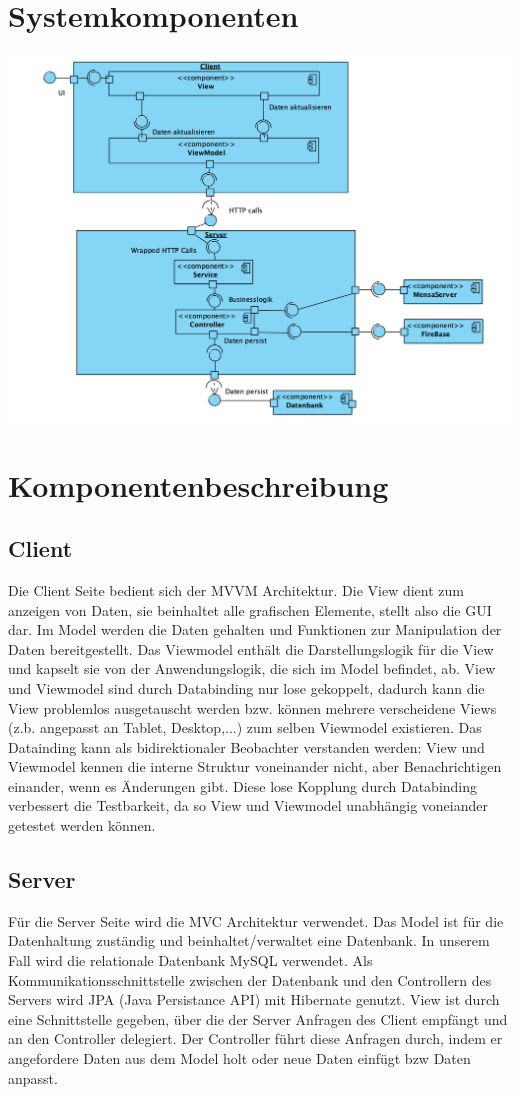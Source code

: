 \documentclass[a4paper]{scrreprt}
\begin{document}
\section{Systemkomponenten}
\includegraphics[width=1.1\textwidth]{Objektdiagramme/komponentDiagramm.png}
\section{Komponentenbeschreibung}
\subsection{Client}
Die Client Seite bedient sich der MVVM Architektur. Die View dient zum anzeigen von Daten, sie beinhaltet alle grafischen Elemente, stellt also die GUI dar. Im Model werden die Daten gehalten und Funktionen zur Manipulation der Daten bereitgestellt.
Das Viewmodel enthält die Darstellungslogik für die View und kapselt sie von der Anwendungslogik, die sich im Model befindet, ab.
View und Viewmodel sind durch Databinding nur lose gekoppelt, dadurch kann die View problemlos ausgetauscht werden bzw. können mehrere verscheidene Views (z.b. angepasst an Tablet, Desktop,...) zum selben Viewmodel existieren.
Das Datainding kann als bidirektionaler Beobachter verstanden werden: View und Viewmodel kennen die interne Struktur voneinander nicht, aber Benachrichtigen einander, wenn es Änderungen gibt. Diese lose Kopplung durch Databinding verbessert die Testbarkeit, da so View und Viewmodel unabhängig voneiander getestet werden können.

\subsection{Server}
Für die Server Seite wird die MVC Architektur verwendet.
Das Model ist für die Datenhaltung zuständig und beinhaltet/verwaltet eine Datenbank.  In unserem Fall wird die relationale Datenbank MySQL verwendet. Als Kommunikationsschnittstelle zwischen der Datenbank und den Controllern des Servers wird JPA (Java Persistance API) mit Hibernate genutzt.
View ist durch eine Schnittstelle gegeben, über die der Server Anfragen des Client empfängt und an den Controller delegiert. Der Controller führt diese Anfragen durch, indem er angefordere Daten aus dem Model holt oder neue Daten einfügt bzw Daten anpasst.
\end{document}

